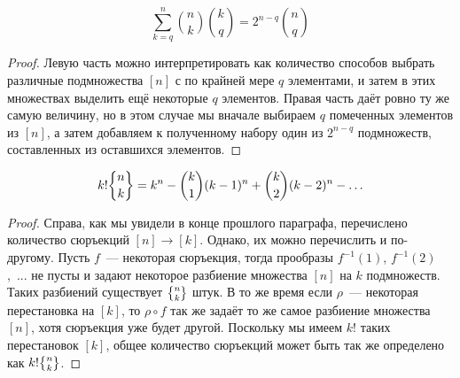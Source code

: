 \begin{thm}
$$\sum_{k=q}^n{n\choose k}{k\choose q} = 2^{n-q}{n\choose q}$$
\end{thm}
\begin{proof}
Левую часть можно интерпретировать как количество способов выбрать различные подмножества $[n]$ с по крайней мере $q$ элементами, и затем в этих множествах выделить ещё некоторые $q$ элементов. Правая часть даёт ровно ту же самую величину, но в этом случае мы вначале выбираем $q$ помеченных элементов из $[n]$, а затем добавляем к полученному набору один из $2^{n-q}$ подмножеств, составленных из оставшихся элементов.
\end{proof}

\begin{thm}
$$k!\sstirling{n}{k} = k^n - {k \choose 1}(k-1)^n + {k\choose 2}(k-2)^n -\ldots$$
\end{thm}
\begin{proof}
Справа, как мы увидели в конце прошлого параграфа, перечислено количество сюръекций $[n]\to[k]$. Однако, их можно перечислить и по-другому. Пусть $f$~--- некоторая сюръекция, тогда прообразы $f^{-1}(1)$, $f^{-1}(2)$,~... не пусты и задают некоторое разбиение множества $[n]$ на $k$ подмножеств. Таких разбиений существует $\sstirling{n}{k}$ штук. В то же время если $\rho$~--- некоторая перестановка на $[k]$, то $\rho\circ f$ так же задаёт то же самое разбиение множества $[n]$, хотя сюръекция уже будет другой. Поскольку мы имеем $k!$ таких перестановок $[k]$, общее количество сюръекций может быть так же определено как $k!\sstirling{n}{k}$.
\end{proof}

